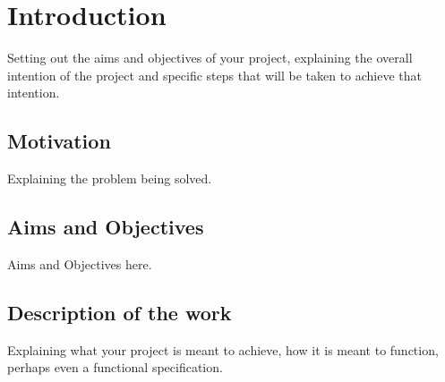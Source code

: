 \chapter{Introduction}

Setting out the aims and objectives of your project, explaining the overall intention of the project and specific steps that will be taken to achieve that intention.

\section{Motivation}

Explaining the problem being solved.


\section{Aims and Objectives}

Aims and Objectives here.


\section{Description of the work}

Explaining what your project is meant to achieve, how it is meant to function, perhaps even a functional specification.


